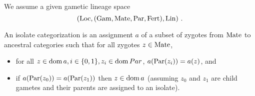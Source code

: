 We assume a given gametic lineage space \[
(\mathrm{Loc}, (\mathrm{Gam}, \mathrm{Mate}, \mathrm{Par}, \mathrm{Fert}), \mathrm{Lin})
\text{ .}
\]

An isolate categorization is an assignment \(a\) of a subset of zygotes
from \(\mathrm{Mate}\) to ancestral categories such that for all zygotes
\(z \in \mathrm{Mate}\),

\begin{itemize}
\tightlist
\item
  for all \(z \in \operatorname{dom}{ a}, i \in \{0, 1\}, z_i \in \operatorname{dom}{ Par}\),
  \(a(\mathrm{Par}(z_i)) = a(z)\), and
\item
  if \(a(\mathrm{Par}(z_0)) = a(\mathrm{Par}(z_1))\) then \(z \in \operatorname{dom}{ a}\) (assuming
  \(z_0\) and \(z_1\) are child gametes and their parents are assigned
  to an isolate).
\end{itemize}



